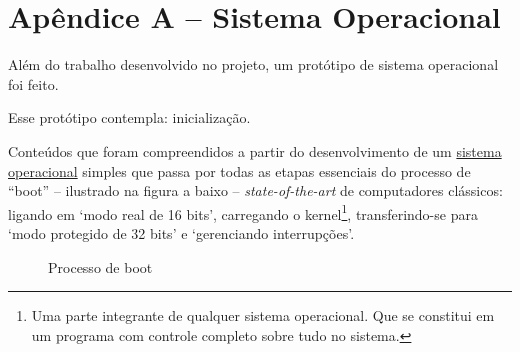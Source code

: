 \section{Apêndice A – Sistema Operacional}
\label{apendeceA}

Além do trabalho desenvolvido no projeto, um protótipo de sistema operacional foi feito.

Esse protótipo contempla: inicialização.

 Conteúdos que foram compreendidos a partir do desenvolvimento de um \href{https://github.com/gzsig/zsig-OS}{sistema operacional} simples que passa por todas as etapas essenciais do processo de ``boot'' – ilustrado na figura a baixo – \textit{state-of-the-art} de computadores clássicos: ligando em `modo real de 16 bits', carregando o kernel\footnote{Uma parte integrante de qualquer sistema operacional. Que se constitui em um programa com controle completo sobre tudo no sistema.}, transferindo-se para `modo protegido de 32 bits' e `gerenciando interrupções'.

\vspace{1cm}
\begin{figure}[H] \centering 
  \caption{\label{zsig_OS_boot} Processo de boot} 
\end{figure}
